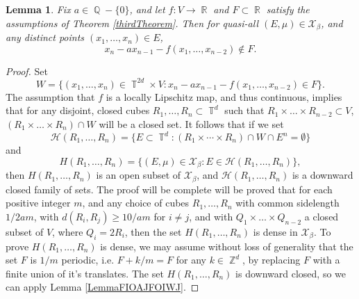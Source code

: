 \documentclass[dvipsnames,letterpaper,12pt]{article}
\numberwithin{equation}{section}
\DeclareMathOperator{\RR}{\mathbb{R}}
\DeclareMathOperator{\ZZ}{\mathbb{Z}}
\DeclareMathOperator{\QQ}{\mathbb{Q}}
\DeclareMathOperator{\TT}{\mathbb{T}}
\newtheorem{lemma}[theorem]{Lemma}
\numberwithin{theorem}{section}
\begin{document}
\begin{lemma}
    Fix $a \in \QQ - \{ 0 \}$, and let $f: V \to \RR$ and $F \subset \RR$ satisfy the assumptions of Theorem \ref{thirdTheorem}. Then for quasi-all $(E,\mu) \in \mathcal{X}_\beta$, and any distinct points $(x_1,\dots,x_n) \in E$,
    \[ x_n - ax_{n-1} - f(x_1,\dots,x_{n-2}) \not \in F. \]
\end{lemma}
\begin{proof}
    Set
    \[ W = \{ (x_1,\dots,x_n) \in \TT^{2d} \times V : x_n - ax_{n-1} - f(x_1,\dots,x_{n-2}) \in F \}. \]
    The assumption that $f$ is a locally Lipschitz map, and thus continuous, implies that for any disjoint, closed cubes $R_1,\dots,R_n \subset \TT^d$ such that $R_1 \times \dots \times R_{n-2} \subset V$, $(R_1 \times \dots \times R_n) \cap W$ will be a closed set. It follows that if we set
    \[ \mathcal{H}(R_1,\dots,R_n) = \{ E \subset \TT^d : (R_1 \times \cdots \times R_n) \cap W \cap E^n = \emptyset \} \]
    and
    \[ H(R_1,\dots,R_n) = \{ (E,\mu) \in \mathcal{X}_\beta: E \in \mathcal{H}(R_1,\dots,R_n) \}, \]
    then $H(R_1,\dots,R_n)$ is an open subset of $\mathcal{X}_\beta$, and $\mathcal{H}(R_1,\dots,R_n)$ is a downward closed family of sets. The proof will be complete will be proved that for each positive integer $m$, and any choice of cubes $R_1,\dots,R_n$ with common sidelength $1/2am$, with $d(R_i,R_j) \geq 10/am$ for $i \neq j$, and with $Q_1 \times \dots \times Q_{n-2}$ a closed subset of $V$, where $Q_i = 2R_i$, then the set $H(R_1,\dots,R_n)$ is dense in $\mathcal{X}_\beta$. To prove $H(R_1,\dots,R_n)$ is dense, we may assume without loss of generality that the set $F$ is $1/m$ periodic, i.e. $F + k / m = F$ for any $k \in \ZZ^d$, by replacing $F$ with a finite union of it's translates. The set $H(R_1,\dots,R_n)$ is downward closed, so we can apply Lemma \ref{LemmaFIOAJFOIWJ}. 


\end{proof}
\end{document}

